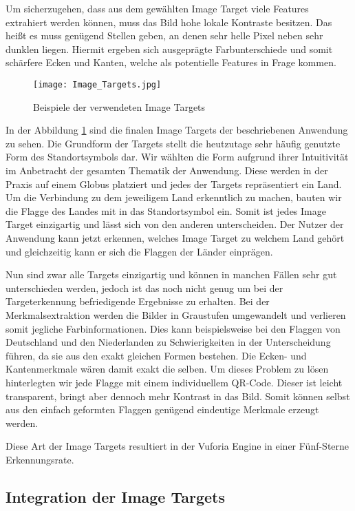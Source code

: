 Um sicherzugehen, dass aus dem gewählten Image Target viele Features extrahiert werden können, muss das Bild hohe lokale Kontraste besitzen. Das heißt es muss genügend Stellen geben, an denen sehr helle Pixel neben sehr dunklen liegen. 
Hiermit ergeben sich ausgeprägte Farbunterschiede und somit schärfere Ecken und Kanten, welche als potentielle Features in Frage kommen.

\begin{figure} [h]
\centering
\texttt{[image: Image\_Targets.jpg]}
\caption{Beispiele der verwendeten Image Targets}
\label{fig:image_targets}
\end{figure}

In der Abbildung \ref{fig:image_targets} sind die finalen Image Targets der beschriebenen Anwendung zu sehen.
Die Grundform der Targets stellt die heutzutage sehr häufig genutzte Form des Standortsymbols dar.
Wir wählten die Form aufgrund ihrer Intuitivität im Anbetracht der gesamten Thematik der Anwendung.
Diese werden in der Praxis auf einem Globus platziert und jedes der Targets repräsentiert ein Land.
Um die Verbindung zu dem jeweiligem Land erkenntlich zu machen, bauten wir die Flagge des Landes mit in das Standortsymbol ein. 
Somit ist jedes Image Target einzigartig und lässt sich von den anderen unterscheiden. 
Der Nutzer der Anwendung kann jetzt erkennen, welches Image Target zu welchem Land gehört und gleichzeitig kann er sich die Flaggen der Länder einprägen. 

Nun sind zwar alle Targets einzigartig und können in manchen Fällen sehr gut unterschieden werden, jedoch ist das noch nicht genug um bei der Targeterkennung befriedigende Ergebnisse zu erhalten. 
Bei der Merkmalsextraktion werden die Bilder in Graustufen umgewandelt und verlieren somit jegliche Farbinformationen. Dies kann beispielsweise bei den Flaggen von Deutschland und den Niederlanden zu Schwierigkeiten in der Unterscheidung führen, da sie aus den exakt gleichen Formen bestehen. 
Die Ecken- und Kantenmerkmale wären damit exakt die selben. 
Um dieses Problem zu lösen hinterlegten wir jede Flagge mit einem individuellem QR-Code. Dieser ist leicht transparent, bringt aber dennoch mehr Kontrast in das Bild. 
Somit können selbst aus den einfach geformten Flaggen genügend eindeutige Merkmale erzeugt werden.

Diese Art der Image Targets resultiert in der Vuforia Engine in einer Fünf-Sterne Erkennungsrate.

\subsection{Integration der Image Targets}\label{integration_image_targets}


